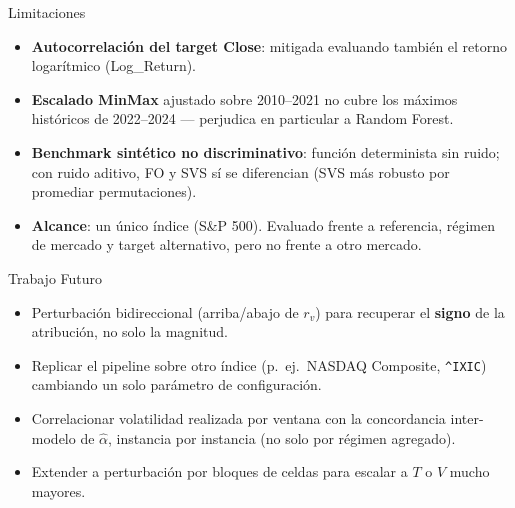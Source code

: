 \documentclass{beamer}
\begin{document}
\begin{frame}{Limitaciones}
    \begin{itemize}
        \small
        \item \textbf{Autocorrelación del target Close}: mitigada
        evaluando también el retorno logarítmico (Log\_Return).
        \item \textbf{Escalado MinMax} ajustado sobre 2010--2021 no
        cubre los máximos históricos de 2022--2024 — perjudica en
        particular a Random Forest.
        \item \textbf{Benchmark sintético no discriminativo}: función
        determinista sin ruido; con ruido aditivo, FO y SVS sí se
        diferencian (SVS más robusto por promediar permutaciones).
        \item \textbf{Alcance}: un único índice (S\&P 500). Evaluado
        frente a referencia, régimen de mercado y target alternativo,
        pero no frente a otro mercado.
    \end{itemize}
\end{frame}

\begin{frame}{Trabajo Futuro}
    \begin{itemize}
        \item Perturbación bidireccional (arriba/abajo de $r_v$) para
        recuperar el \textbf{signo} de la atribución, no solo la
        magnitud.
        \item Replicar el pipeline sobre otro índice (p.\ ej.\ NASDAQ
        Composite, \texttt{\^{}IXIC}) cambiando un solo parámetro de
        configuración.
        \item Correlacionar volatilidad realizada por ventana con la
        concordancia inter-modelo de $\hat{\alpha}$, instancia por
        instancia (no solo por régimen agregado).
        \item Extender a perturbación por bloques de celdas para
        escalar a $T$ o $V$ mucho mayores.
    \end{itemize}
\end{frame}
\end{document}
